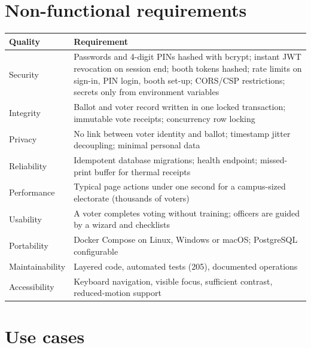 \section{Non-functional requirements}

\begin{center}
\small
\begin{tabularx}{\linewidth}{@{}l X@{}}
\toprule
\textbf{Quality} & \textbf{Requirement} \\
\midrule
Security & Passwords and 4-digit PINs hashed with bcrypt; instant JWT revocation on session end; booth tokens hashed; rate limits on sign-in, PIN login, booth set-up; CORS/CSP restrictions; secrets only from environment variables \\
Integrity & Ballot and voter record written in one locked transaction; immutable vote receipts; concurrency row locking \\
Privacy & No link between voter identity and ballot; timestamp jitter decoupling; minimal personal data \\
Reliability & Idempotent database migrations; health endpoint; missed-print buffer for thermal receipts \\
Performance & Typical page actions under one second for a campus-sized electorate (thousands of voters) \\
Usability & A voter completes voting without training; officers are guided by a wizard and checklists \\
Portability & Docker Compose on Linux, Windows or macOS; PostgreSQL configurable \\
Maintainability & Layered code, automated tests (205), documented operations \\
Accessibility & Keyboard navigation, visible focus, sufficient contrast, reduced-motion support \\
\bottomrule
\end{tabularx}
\end{center}

\section{Use cases}

